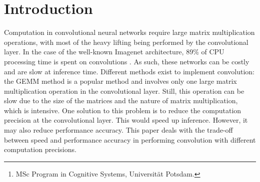 \documentclass[12pt]{article}
\title{\doctitle}
\author{C. Clayton Violand\footnote{MSc Program in Cognitive Systems, Universit\"at Potsdam.}}
\begin{document}
\maketitle










\begin{abstract}
It is well-known in principle that the full precision of computer hardware (e.g. 32 or 64 bit floats) is not really needed for neural networks. By design they have to be robust against small perturbations in the data and also the activations of units in higher layers (i.e. dropout). Thus, there is a recent trend of moving to low-precision calculations in order to speed up inference in deep neural networks. In fact, the new nVidia GPUs coming out at the end of this year will feature an 8-bit integer mode specifically for inference in deep Neural Networks, which in theory runs 4x as fast as single precision floats. However, there are few studies on when exactly low precision is enough and how much speed this can bring. This thesis deals with the implementation of neural networks with different computing precisions, and how well they still work depending on the Neural Network architecture. It also explores the gain in speed obtainable on different architectures.
\end{abstract}










\section{Introduction}
Computation in convolutional neural networks require large matrix multiplication operations, with most of the heavy lifting being performed by the convolutional layer. In the case of the well-known Imagenet architecture, 89\% of CPU processing time is spent on convolutions \cite{gemm}. As such, these networks can be costly and are slow at inference time. Different methods exist to implement convolution: the GEMM method is a popular method and involves only one large matrix multiplication operation in the convolutional layer. Still, this operation can be slow due to the size of the matrices and the nature of matrix multiplication, which is intensive. 
One solution to this problem is to reduce the computation precision at the convolutional layer. This would speed up inference. However, it may also reduce performance accuracy. This paper deals with the trade-off between speed and performance accuracy in performing convolution with different computation precisions.
\end{document}
